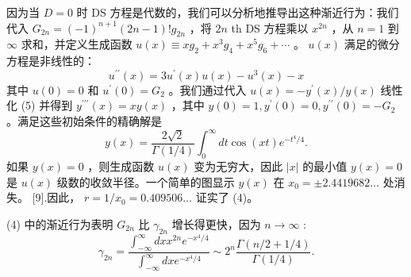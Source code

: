 \documentclass[UTF8]{article}
\begin{document}
因为当 $D=0$ 时 DS 方程是代数的，我们可以分析地推导出这种渐近行为：我们代入 $G_{2 n}=(-1)^{n+1}(2 n-1) ! g_{2 n}$ ，将 $2 n$ th DS 方程乘以 $x^{2 n}$ ，从 $n=1$ 到 $\infty$ 求和，并定义生成函数 $u(x) \equiv x g_2+x^3 g_4+x^5 g_6+\cdots$ 。 $u(x)$ 满足的微分方程是非线性的： $$u^{\prime \prime}(x)=3 u^{\prime}(x) u(x)-u^3(x)-x
$$ 其中 $u(0)=0$ 和 $u^{\prime}(0)=G_2$ 。我们通过代入 $u(x)=-y^{\prime}(x) / y(x)$ 线性化 (5) 并得到 $y^{\prime \prime \prime}(x)=x y(x)$ ，其中 $y(0)=1, y^{\prime}(0)=0, y^{\prime \prime}(0)=-G_2$ 。满足这些初始条件的精确解是 $$y(x)=\frac{2 \sqrt{2}}{\Gamma(1 / 4)} \int_0^{\infty} d t \cos (x t) e^{-t^4 / 4} .
$$ 如果 $y(x)=0$ ，则生成函数 $u(x)$ 变为无穷大，因此 $|x|$ 的最小值 $y(x)=0$ 是 $u(x)$ 级数的收敛半径。一个简单的图显示 $y(x)$ 在 $x_0= \pm 2.4419682 \ldots$ 处消失。 [9].因此， $r=1 / x_0=0.409506 \ldots$ 证实了 (4)。

(4) 中的渐近行为表明 $G_{2 n}$ 比 $\gamma_{2 n}$ 增长得更快，因为 $n \rightarrow \infty$ : $$
\gamma_{2 n}=\frac{\int_{-\infty}^{\infty} d x x^{2 n} e^{-x^4 / 4}}{\int_{-\infty}^{\infty} d x e^{-x^4 / 4}} \sim 2^n \frac{\Gamma(n / 2+1 / 4)}{\Gamma(1 / 4)} .
$$
\end{document}
